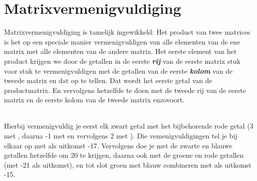 \section{Matrixvermenigvuldiging}
Matrixvermenigvuldiging is tamelijk ingewikkeld:
{Het product van twee matrices is 
	het op een speciale manier vermenigvuldigen van  alle elementen van de ene matrix met alle elementen van de andere matrix.} 
Het eerste element van het product krijgen we door de getallen in de eerste \textit{\textbf{rij}} van de eerste matrix stuk voor stuk te vermenigvuldigen met de getallen van de eerste \textit{\textbf{kolom}} van de tweede matrix en dat op te tellen. Dat wordt het eerste getal van de productmatrix. En vervolgens hetzelfde te doen met de tweede rij van de eerste matrix en de eerste kolom van de tweede matrix enzovoort. \\ \\

Hierbij vermenigvuldig je eerst elk zwart getal  met het bijbehorende rode getal (3 met , daarna -1 met   en vervolgens 2 met ). Die vemenigvuldigingen  tel je bij elkaar  op met als uitkomst -17. Vervolgens doe je met de zwarte en blauwe getallen  hetzelfde om 20 te krijgen, daarna ook met de groene en rode getallen  (met -21 als uitkomst), en tot slot groen met blauw combineren met als uitkomst -15.

